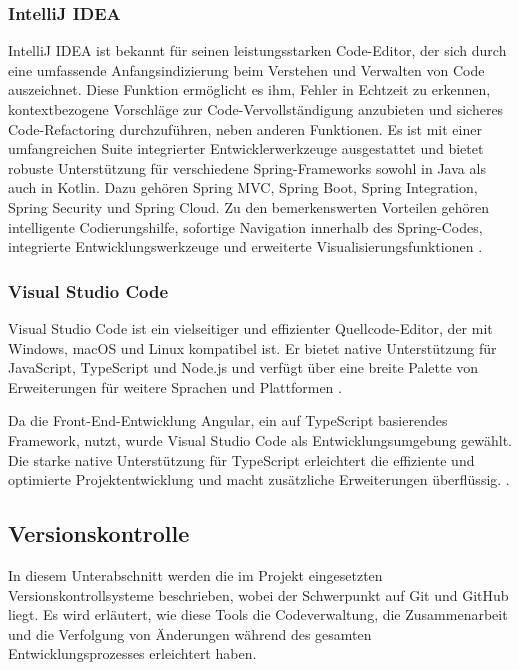 \subsubsection{IntelliJ IDEA}

IntelliJ IDEA ist bekannt für seinen leistungsstarken Code-Editor, der sich durch eine umfassende Anfangsindizierung beim Verstehen und Verwalten von Code auszeichnet. Diese Funktion ermöglicht es ihm, Fehler in Echtzeit zu erkennen, kontextbezogene Vorschläge zur Code-Vervollständigung anzubieten und sicheres Code-Refactoring durchzuführen, neben anderen Funktionen. Es ist mit einer umfangreichen Suite integrierter Entwicklerwerkzeuge ausgestattet und bietet robuste Unterstützung für verschiedene Spring-Frameworks sowohl in Java als auch in Kotlin. Dazu gehören Spring MVC, Spring Boot, Spring Integration, Spring Security und Spring Cloud. Zu den bemerkenswerten Vorteilen gehören intelligente Codierungshilfe, sofortige Navigation innerhalb des Spring-Codes, integrierte Entwicklungswerkzeuge und erweiterte Visualisierungsfunktionen \cite{Jetbrains:o.J}.


\subsubsection{Visual Studio Code}

 Visual Studio Code ist ein vielseitiger und effizienter Quellcode-Editor, der mit Windows, macOS und Linux kompatibel ist. Er bietet native Unterstützung für JavaScript, TypeScript und Node.js und verfügt über eine breite Palette von Erweiterungen für weitere Sprachen und Plattformen \cite{visual-studio:o.J}.

Da die Front-End-Entwicklung Angular, ein auf TypeScript basierendes Framework, nutzt, wurde Visual Studio Code als Entwicklungsumgebung gewählt. Die starke native Unterstützung für TypeScript erleichtert die effiziente und optimierte Projektentwicklung und macht zusätzliche Erweiterungen überflüssig. \cite{visualstudio-angular:o.J}.

\subsection{Versionskontrolle}
In diesem Unterabschnitt werden die im Projekt eingesetzten Versionskontrollsysteme beschrieben, wobei der Schwerpunkt auf Git und GitHub liegt. Es wird erläutert, wie diese Tools die Codeverwaltung, die Zusammenarbeit und die Verfolgung von Änderungen während des gesamten Entwicklungsprozesses erleichtert haben.
